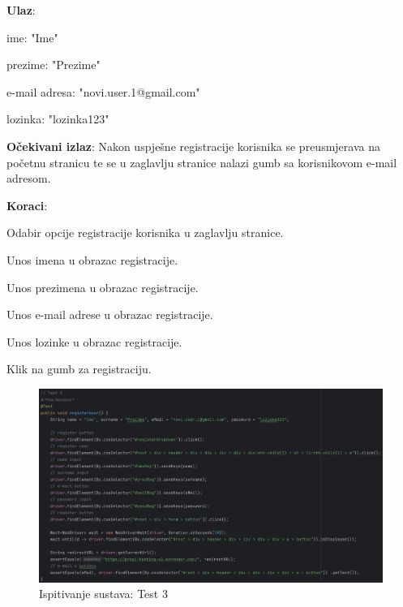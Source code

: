		 	\begin{packed_item} 
		 		\item \textbf{Ulaz}: 
		 		\begin{packed_item} 
		 			\item ime: "Ime"
		 			\item prezime: "Prezime"
		 			\item e-mail adresa: "novi.user.1@gmail.com"
		 			\item lozinka: "lozinka123"
		 		\end{packed_item}
		 		\item \textbf{Očekivani izlaz}: Nakon uspješne registracije korisnika se preusmjerava na početnu stranicu te se u zaglavlju stranice nalazi gumb sa korisnikovom e-mail adresom.
		 		\item \textbf{Koraci}:
		 		\begin{packed_enum} 
		 			\item Odabir opcije registracije korisnika u zaglavlju stranice.
		 			\item Unos imena u obrazac registracije.
		 			\item Unos prezimena u obrazac registracije.
		 			\item Unos e-mail adrese u obrazac registracije.
		 			\item Unos lozinke u obrazac registracije.
		 			\item Klik na gumb za registraciju.
		 		\end{packed_enum}
		 	\end{packed_item}
		 	
		 	\begin{figure}[H]
		 		\includegraphics[width=\textwidth]{slike/SeleniumTest3.png} %
		 		\caption{Ispitivanje sustava: Test 3}
		 		\label{fig:SeleniumTest3} %
		 	\end{figure}
		 	
